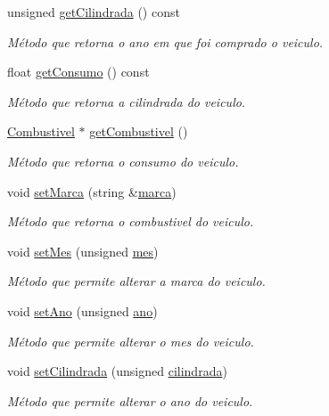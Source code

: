 \begin{DoxyCompactItemize}
unsigned \hyperlink{class_veiculo_a03fe5c5380da49cdc25014bf90934263}{get\+Cilindrada} () const 
\begin{DoxyCompactList}\small\item\em Método que retorna o ano em que foi comprado o veiculo. \end{DoxyCompactList}\item 
float \hyperlink{class_veiculo_ad40e432b47edddbdff461d4b44a4cb14}{get\+Consumo} () const 
\begin{DoxyCompactList}\small\item\em Método que retorna a cilindrada do veiculo. \end{DoxyCompactList}\item 
\hyperlink{class_combustivel}{Combustivel} $\ast$ \hyperlink{class_veiculo_a2198e13a144ece6d32634dd6bdb160c9}{get\+Combustivel} ()
\begin{DoxyCompactList}\small\item\em Método que retorna o consumo do veiculo. \end{DoxyCompactList}\item 
void \hyperlink{class_veiculo_a4376b75295af584bea72db312e909d52}{set\+Marca} (string \&\hyperlink{class_veiculo_ab20b89442a0ddaedd074bb0de75838c8}{marca})
\begin{DoxyCompactList}\small\item\em Método que retorna o combustivel do veiculo. \end{DoxyCompactList}\item 
void \hyperlink{class_veiculo_abce426bdb78d81f59e4bd3de01b05fea}{set\+Mes} (unsigned \hyperlink{class_veiculo_ac4146f7b3d38e31e3225074e0fb0dea9}{mes})
\begin{DoxyCompactList}\small\item\em Método que permite alterar a marca do veiculo. \end{DoxyCompactList}\item 
void \hyperlink{class_veiculo_ad71370069a5a0f587fced2c49028cdfa}{set\+Ano} (unsigned \hyperlink{class_veiculo_ae141824a9353b3f7ed99d5c34c830fe2}{ano})
\begin{DoxyCompactList}\small\item\em Método que permite alterar o mes do veiculo. \end{DoxyCompactList}\item 
void \hyperlink{class_veiculo_ad41e09a8864fc77143c30218c2441f77}{set\+Cilindrada} (unsigned \hyperlink{class_veiculo_a3c3b3f2f958a98b48fa5e4f46007c9f9}{cilindrada})
\begin{DoxyCompactList}\small\item\em Método que permite alterar o ano do veiculo. \end{DoxyCompactList}\item 

\end{DoxyCompactItemize}
